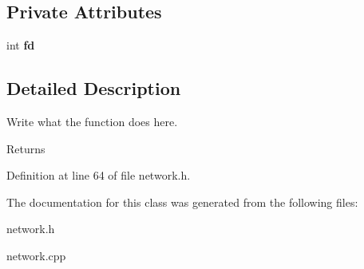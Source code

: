 \subsection*{Private Attributes}
\begin{DoxyCompactItemize}
\item 
\hypertarget{classNetworkServer_a3a4cbba07f7c425a9147f8a21b714e7f}{int {\bfseries fd}}\label{classNetworkServer_a3a4cbba07f7c425a9147f8a21b714e7f}

\end{DoxyCompactItemize}


\subsection{Detailed Description}
Write what the function does here. 

\begin{DoxyReturn}{Returns}

\end{DoxyReturn}


Definition at line 64 of file network.\+h.



The documentation for this class was generated from the following files\+:\begin{DoxyCompactItemize}
\item 
network.\+h\item 
network.\+cpp\end{DoxyCompactItemize}
